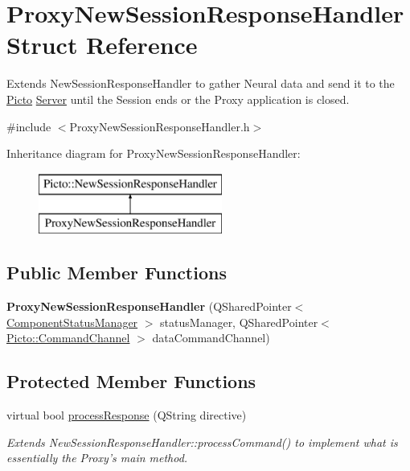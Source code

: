 \hypertarget{struct_proxy_new_session_response_handler}{\section{Proxy\-New\-Session\-Response\-Handler Struct Reference}
\label{struct_proxy_new_session_response_handler}
}


Extends New\-Session\-Response\-Handler to gather Neural data and send it to the \hyperlink{namespace_picto}{Picto} \hyperlink{class_server}{Server} until the Session ends or the Proxy application is closed.  




{\ttfamily \#include $<$Proxy\-New\-Session\-Response\-Handler.\-h$>$}

Inheritance diagram for Proxy\-New\-Session\-Response\-Handler\-:\begin{figure}[H]
\begin{center}
\leavevmode
\includegraphics[height=2.000000cm]{struct_proxy_new_session_response_handler}
\end{center}
\end{figure}
\subsection*{Public Member Functions}
\begin{DoxyCompactItemize}
\item 
\hypertarget{struct_proxy_new_session_response_handler_ad9715fdd4616f60213b17f7221a431ea}{{\bfseries Proxy\-New\-Session\-Response\-Handler} (Q\-Shared\-Pointer$<$ \hyperlink{class_component_status_manager}{Component\-Status\-Manager} $>$ status\-Manager, Q\-Shared\-Pointer$<$ \hyperlink{class_picto_1_1_command_channel}{Picto\-::\-Command\-Channel} $>$ data\-Command\-Channel)}\label{struct_proxy_new_session_response_handler_ad9715fdd4616f60213b17f7221a431ea}

\end{DoxyCompactItemize}
\subsection*{Protected Member Functions}
\begin{DoxyCompactItemize}
\item 
virtual bool \hyperlink{struct_proxy_new_session_response_handler_a122cda53c346211dc8ad503dea11727d}{process\-Response} (Q\-String directive)
\begin{DoxyCompactList}\small\item\em Extends New\-Session\-Response\-Handler\-::process\-Command() to implement what is essentially the Proxy's main method. \end{DoxyCompactList}\end{DoxyCompactItemize}
